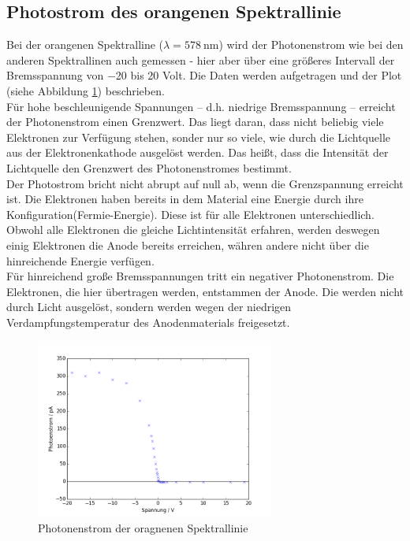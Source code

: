 \subsection{Photostrom des orangenen Spektrallinie}
Bei der orangenen Spektralline ($\lambda = \SI{578}{\nano\meter}$) wird der Photonenstrom wie bei den anderen Spektrallinen auch gemessen - hier aber über eine größeres Intervall der Bremsspannung von  \num{-20} bis \num{20} Volt. Die Daten werden aufgetragen und der Plot (siehe Abbildung \ref{fig:orange}) beschrieben. \\
Für hohe beschleunigende Spannungen -- d.h. niedrige Bremsspannung -- erreicht der Photonenstrom einen Grenzwert. Das liegt daran, dass nicht beliebig viele Elektronen zur Verfügung stehen, sonder nur so viele, wie durch die Lichtquelle aus der Elektronenkathode ausgelöst werden. Das heißt, dass die Intensität der Lichtquelle den Grenzwert des Photonenstromes bestimmt. \\
Der Photostrom bricht nicht abrupt auf null ab, wenn die Grenzspannung erreicht ist. Die Elektronen haben bereits in dem Material eine Energie durch ihre Konfiguration(Fermie-Energie). Diese ist für alle Elektronen unterschiedlich. Obwohl alle Elektronen die gleiche Lichtintensität erfahren, werden deswegen einig Elektronen die Anode bereits erreichen, währen andere nicht über die hinreichende Energie verfügen. \\
Für hinreichend große Bremsspannungen tritt ein negativer Photonenstrom. Die Elektronen, die hier übertragen werden, entstammen der Anode. Die werden nicht durch Licht ausgelöst, sondern werden wegen der niedrigen Verdampfungstemperatur des Anodenmaterials freigesetzt.


\begin{figure}[h!]
	\centering
	\includegraphics[width=0.7\textwidth]{build/OrangeWellenlange.png}
	\caption{Photonenstrom der oragnenen Spektrallinie}
	\label{fig:orange}
\end{figure}

	
